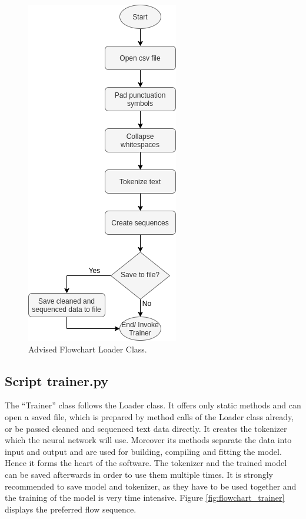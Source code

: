 \documentclass[conference]{IEEEtran}
\begin{document}
\begin{figure}[htbp]
\centerline{\includegraphics[scale=0.65]{pictures/flowchart_loader.png}}
\caption{Advised Flowchart Loader Class.}
\label{fig:flowchart_loader}
\end{figure}

\subsection{Script trainer.py}\label{subsec_trainer}

The ``Trainer'' class follows the Loader class. It offers only static methods and can open a saved file, which is prepared by method calls of the Loader class already, or be passed cleaned and sequenced text data directly. It creates the tokenizer which the neural network will use. Moreover its methods separate the data into input and output and are used for building, compiling and fitting the model. Hence it forms the heart of the software. The tokenizer and the trained model can be saved afterwards in order to use them multiple times. It is strongly recommended to save model and tokenizer, as they have to be used together and the training of the model is very time intensive. Figure \ref{fig:flowchart_trainer} displays the preferred flow sequence.
\end{document}
